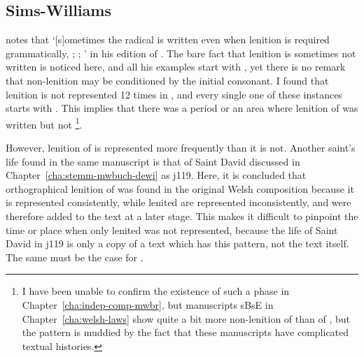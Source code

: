 \subsection{Sims-Williams}
\label{sec:sims-williams}

\Textcite[107n]{Sim_Buchedd18} notes that `[s]ometimes the radical is written even when lenition is required grammatically, \eg {}; ; ' in his edition of . The bare fact that lenition is sometimes not written is noticed here, and all his examples start with , yet there is no remark that non-lenition may be conditioned by the initial consonant. I found that lenition is not represented 12 times in , and every single one of these instances starts with . This implies that there was a period or an area where lenition of  was written but not \footnote{I have been unable to confirm the existence of such a phase in Chapter~\ref{cha:indep-comp-mwbr}, but manuscripts \gls{sB}\gls{sE} in Chapter~\ref{cha:welsh-laws} show quite a bit more non-lenition of  than of , but the pattern is muddied by the fact that these manuscripts have complicated textual histories.}.

However, lenition of  is represented more frequently than it is not. Another saint's life found in the same manuscript  is that of Saint David discussed in Chapter~\ref{cha:stemm-mwbuch-dewi} as \gls{j119}. Here, it is concluded that orthographical lenition of  was found in the original Welsh composition because it is represented consistently, while lenited  are represented inconsistently, and were therefore added to the text at a later stage. This makes it difficult to pinpoint the time or place when only lenited  was not represented, because the life of Saint David in \gls{j119} is only a copy of a text which has this pattern, not the text itself. The same must be the case for .

